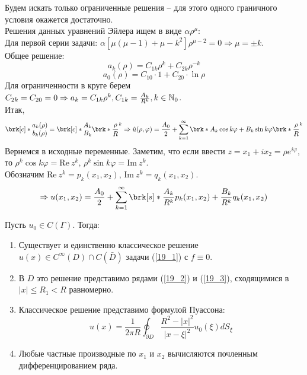 Будем искать только ограниченные решения -- для этого одного граничного условия окажется достаточно.\\
Решения данных уравнений Эйлера ищем в виде $\alpha \rho^\mu$:\\
Для первой серии задачи: $\alpha[\mu(\mu-1)+\mu - k^2] \rho^{\mu-2} = 0 \Rightarrow \mu = \pm k$.\\
Общее решение:
$$ a_k(\rho) = C_{1k}\rho^k+C_{2k}\rho^{-k} $$
$$a_0(\rho) = C_{10} \cdot 1 + C_{20} \cdot \ln \rho$$
Для ограниченности в круге берем $C_{2k} = C_{20} = 0 \Rightarrow a_k = C_{1k} \rho^k, C_{1k} = \frac{A_k}{R^k}, k \in \mathbb{N}_0$.\\
Итак, 
\begin{equation}\label{19_2}
\brk[c]*{\begin{matrix} a_k(\rho)\\ b_k(\rho) \end{matrix}} = \brk[c]*{\begin{matrix} A_k\\ B_k \end{matrix}}\brk*{\frac{\rho}{R}}^k \Rightarrow \hat u(\rho, \varphi) = \frac{A_0}{2} + \sum_{k=1}^{\infty}\brk*{A_k \cos k \varphi + B_k \sin k \varphi} \brk*{\frac{\rho}{R}}^k  
\end{equation}
Вернемся в исходные переменные. Заметим, что если ввести $z = x_1+ix_2 = \rho e^{i \varphi}$, то $\rho^k \cos k \varphi = \mathrm{Re} \ z^k, \,  \rho^k \sin k \varphi = \mathrm{Im} \ z^k$.\\ Обозначим $\mathrm{Re} \ z^k = p_k(x_1,x_2), \, \mathrm{Im} \ z^k = q_k(x_1,x_2)$.
\begin{equation} \label{19_3}
\Rightarrow u(x_1,x_2) = \frac{A_0}{2}+ \sum_{k=1}^{\infty}\brk[s]*{\frac{A_k}{R^k} p_k(x_1,x_2) + \frac{B_k}{R^k} q_k(x_1,x_2)} 
\end{equation}
\begin{theorem}
Пусть $u_0 \in C(\Gamma)$. Тогда:
\begin{enumerate}
\item Существует и единственно классическое решение $u(x) \in C^\infty(D) \cap C(\bar D)$ задачи (\ref{19_1}) с $f \equiv 0$.
\item В $D$ это решение представимо рядами (\ref{19_2}) и (\ref{19_3}), сходящимися в $|x| \leq R_1 < R$ равномерно.
\item Классическое решение представимо формулой Пуассона: \[u(x) = \frac{1}{2\pi R} \oint_{\partial D} \frac{R^2 - |x|^2}{|x- \xi|^2}u_0(\xi) dS_\xi\]
\item Любые частные производные по $x_1$ и $x_2$ вычисляются почленным дифференцированием ряда.
\end{enumerate}
\end{theorem}
